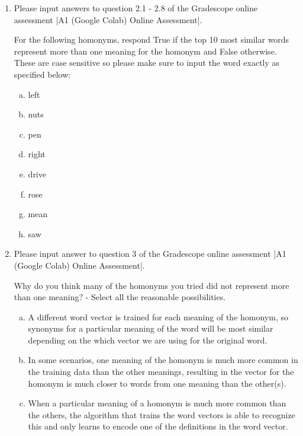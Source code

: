 \begin{enumerate}[1.]

\item {}

Please input answers to question 2.1 - 2.8 of the Gradescope online assessment |A1 (Google Colab) Online Assessment|.

For the following homonyms, respond True if the top 10 most similar words represent more than one meaning for the homonym and False otherwise. These are case sensitive so please make sure to input the word exactly as specified below:

\begin{enumerate}[a.]
\item left
\item nuts
\item pen
\item right
\item drive
\item rose
\item mean
\item saw
\end{enumerate}


\item {}

Please input answer to question 3 of the Gradescope online assessment |A1 (Google Colab) Online Assessment|.

Why do you think many of the homonyms you tried did not represent more than one meaning? - Select all the reasonable possibilities.

\begin{enumerate}[a.]
\item A different word vector is trained for each meaning of the homonym, so synonyms for a particular meaning of the word will be most similar depending on the which vector we are using for the original word.

\item In some scenarios, one meaning of the homonym is much more common in the training data than the other meanings, resulting in the vector for the homonym is much closer to words from one meaning than the other(s).

\item When a particular meaning of a homonym is much more common than the others, the algorithm that trains the word vectors is able to recognize this and only learns to encode one of the definitions in the word vector.
\end{enumerate}


\end{enumerate}
